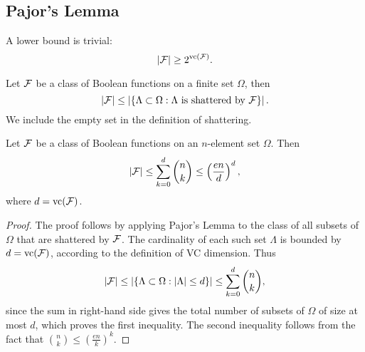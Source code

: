 \begin{example}
    
\end{example}

\begin{remark}
    
\end{remark}

\subsection{Pajor's Lemma}

A lower bound is trivial:
\begin{equation*}
    |{\mathcal F}|\geq 2^{\text{vc}({\mathcal F})}.
\end{equation*}

\begin{lemma}
    Let \({\mathcal F}\) be a class of Boolean functions on a finite set \(\Omega\), then
    \begin{equation*}
        |{\mathcal F}|\leq\left|\left\{\Lambda\subset\Omega:\Lambda\text{ is shattered by }{\mathcal F}\right\}\right|.
    \end{equation*}
    We include the empty set in the definition of shattering.
\end{lemma}

\begin{theorem}
    Let \({\mathcal F}\) be a class of Boolean functions on an \(n\)-element set \(\Omega\). Then
    \begin{equation*}
        |{\mathcal F}|\leq\sum_{k=0}^{d}\binom{n}{k}\leq\left(\frac{en}{d}\right)^{d},
    \end{equation*}
    where \(d=\text{vc}({\mathcal F})\).
\end{theorem}

\begin{proof}
    The proof follows by applying Pajor's Lemma to the class of all subsets of \(\Omega\) that are shattered by \({\mathcal F}\). The cardinality of each such set \(\Lambda\) is bounded by \(d=\text{vc}({\mathcal F})\), according to the definition of VC dimension. Thus
    \begin{equation*}
        |{\mathcal F}|\leq\left|\left\{\Lambda\subset\Omega:|\Lambda|\leq d\right\}\right|\leq\sum_{k=0}^{d}\binom{n}{k},
    \end{equation*}
    since the sum in right-hand side gives the total number of subsets of \(\Omega\) of size at most \(d\), which proves the first inequality. The second inequality follows from the fact that \(\binom{n}{k}\leq\left(\frac{en}{k}\right)^{k}\).
\end{proof}

